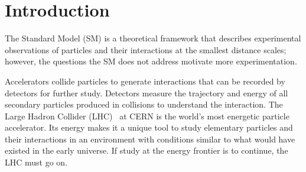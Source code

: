 
\chapter{Introduction}
\label{chap:intro}



The Standard Model (SM) is a theoretical framework that describes experimental observations of particles and their interactions at the smallest distance scales; however, the questions the SM does not address motivate more experimentation. 

Accelerators collide particles to generate interactions that can be recorded by detectors for further study. Detectors measure the trajectory and energy of all secondary particles produced in collisions to understand the interaction. The Large Hadron Collider (LHC)~\cite{evans_lhc_2008} at CERN is the world's most energetic particle accelerator. Its energy makes it a unique tool to study elementary particles and their interactions in an environment with conditions similar to what would have existed in the early universe. If study at the energy frontier is to continue, the LHC must go on.

